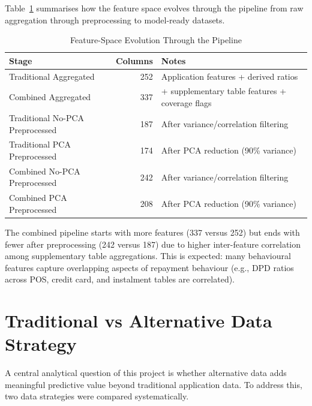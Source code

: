 Table~\ref{tab:feature_evolution} summarises how the feature space evolves through the pipeline from raw aggregation through preprocessing to model-ready datasets.

\begin{table}[H]
\centering
\caption{Feature-Space Evolution Through the Pipeline}
\label{tab:feature_evolution}
\begin{tabular}{lrl}
\toprule
\textbf{Stage} & \textbf{Columns} & \textbf{Notes} \\
\midrule
Traditional Aggregated & 252 & Application features + derived ratios \\
Combined Aggregated & 337 & + supplementary table features + coverage flags \\
Traditional No-PCA Preprocessed & 187 & After variance/correlation filtering \\
Traditional PCA Preprocessed & 174 & After PCA reduction (90\% variance) \\
Combined No-PCA Preprocessed & 242 & After variance/correlation filtering \\
Combined PCA Preprocessed & 208 & After PCA reduction (90\% variance) \\
\bottomrule
\end{tabular}
\end{table}

The combined pipeline starts with more features (337 versus 252) but ends with fewer after preprocessing (242 versus 187) due to higher inter-feature correlation among supplementary table aggregations. This is expected: many behavioural features capture overlapping aspects of repayment behaviour (e.g., DPD ratios across POS, credit card, and instalment tables are correlated).

\section{Traditional vs Alternative Data Strategy}
\label{sec:trad_vs_alt}

A central analytical question of this project is whether alternative data adds meaningful predictive value beyond traditional application data. To address this, two data strategies were compared systematically.

